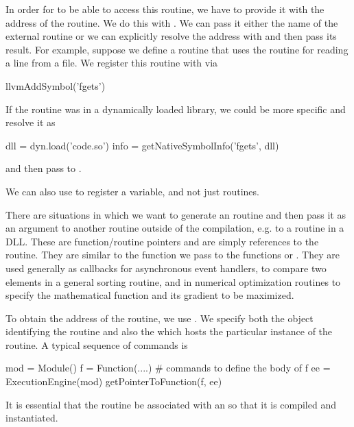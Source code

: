 In order for \llvm{} to
be able to access this routine, we have to provide it with the address
of the routine.  We do this with .  We can pass
it either the name of the external routine or we can explicitly
resolve the address with  and then pass its
result.
For example, suppose we define a routine that uses the 
\C{} routine  for reading a line from a file.
We register this routine with \llvm{} via
\begin{RCode}
llvmAddSymbol('fgets')
\end{RCode}
If the routine was in a dynamically loaded library, we could be
more specific and resolve it as
\begin{RCode}
dll = dyn.load('code.so')
info = getNativeSymbolInfo('fgets', dll)
\end{RCode}
and then pass  to .

We can also use  to register a variable, and not
just routines.



There are situations in which we want to generate an \llvm{} routine
and then pass it as an argument to another routine outside of the
\llvm{} compilation, e.g. to a routine in a DLL.  These are
function/routine pointers and are simply references to the routine.
They are similar to the function we pass to the \R{} functions
 or .  They are used generally as callbacks
for asynchronous event handlers, to compare two elements in a general
sorting routine, and in numerical optimization routines to specify the
mathematical function and its gradient to be maximized.

To obtain the address of the \llvm{} routine, we use
.  We specify both the 
object identifying the \llvm{} routine and also the
 which hosts the particular instance of the
routine. 
A typical sequence of commands is 
\begin{RCode}
mod = Module()
f = Function(....)
# commands to define the body of f
ee = ExecutionEngine(mod)
getPointerToFunction(f, ee)
\end{RCode}
It is essential that the routine be associated with an
 so that it is compiled and instantiated.



